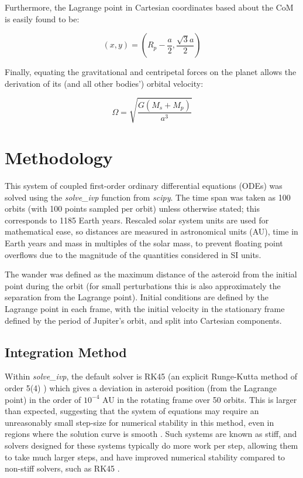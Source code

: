 \documentclass[11pt, a4paper,twocolumn]{article} %
\begin{document}
Furthermore, the Lagrange point in Cartesian coordinates based about the CoM is easily found to be:

\begin{equation}
(x,y) = \left( R_{p} - \frac{a}{2}, \frac{ \sqrt{3} a}{2} \right)
\end{equation}

Finally, equating the gravitational and centripetal forces on the planet allows the derivation of its (and all other bodies') orbital velocity:

\begin{equation} \label{frequency}
\Omega = \sqrt{\frac{G (M_{s} + M_{p})}{a^{3}}}
\end{equation}

\section{Methodology}
This system of coupled first-order ordinary differential equations (ODEs) was solved using the \textit{solve\_ivp} function from \textit{scipy}. The time span was taken as 100 orbits (with 100 points sampled per orbit) unless otherwise stated; this corresponds to 1185 Earth years. Rescaled solar system units are used for mathematical ease, so distances are measured in astronomical units (AU), time in Earth years and mass in multiples of the solar mass, to prevent floating point overflows due to the magnitude of the quantities considered in SI units.

The wander was defined as the maximum distance of the asteroid from the initial point during the orbit (for small perturbations this is also approximately the separation from the Lagrange point). Initial conditions are defined by the Lagrange point in each frame, with the initial velocity in the stationary frame defined by the period of Jupiter's orbit, and split into Cartesian components.

\subsection{Integration Method}
Within \textit{solve\_ivp}, the default solver is RK45 (an explicit Runge-Kutta method of order 5(4) \cite{Dormand1980}) which gives a deviation in asteroid position (from the Lagrange point) in the order of $ 10^{-4}$ AU in the rotating frame over 50 orbits. This is larger than expected, suggesting that the system of equations may require an unreasonably small step-size for numerical stability in this method, even in regions where the solution curve is smooth \cite{Lambert1991}. Such systems are known as stiff, and solvers designed for these systems typically do more work per step, allowing them to take much larger steps, and have improved numerical stability compared to non-stiff solvers, such as RK45 \cite{Byrne1987}. 
\end{document}
